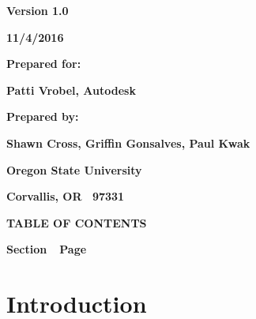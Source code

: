 \documentclass[letterpaper, 10pt, draftclsnofoot, compsoc, onecolumn]{IEEEtran}
\begin{document}
\bigskip
\bigskip
\bigskip

\begin{figure}
\centering
\end{figure}

\bigskip
\bigskip

{\centering{}\bfseries\color{black}
Version 1.0
\par}

{\centering{}\bfseries\color{black}
11/4/2016
\par}


\bigskip
\bigskip

{\centering{}\bfseries\color{black}
Prepared for:
\par}

{\centering{}\bfseries\color{black}
Patti Vrobel, Autodesk
\par}


\bigskip
\bigskip

{\centering{}\bfseries\color{black}
Prepared by:  
\par}

{\centering{}\bfseries\color{black}
Shawn Cross, Griffin Gonsalves, Paul Kwak
\par}

{\centering{}\bfseries\color{black}
Oregon State University
\par}

{\centering{}\bfseries\color{black}
Corvallis, OR \ 97331
\par}


{\centering{}\bfseries\color{black}
TABLE OF CONTENTS
\par}

\bigskip

{\bfseries\color{black}
Section\ \ Page}

\setcounter{tocdepth}{9}
\renewcommand\contentsname{}
\tableofcontents

\bigskip
\clearpage

\section[Introduction]{\rmfamily\bfseries\color{black}
Introduction}
\end{document}
